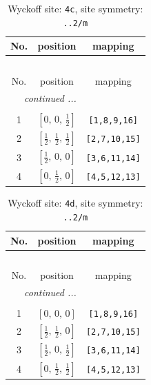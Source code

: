 \documentclass[fleqn,8pt]{jsarticle}
\begin{document}
\renewcommand{\arraystretch}{1.2}
\begin{longtable}{ccc}
\caption{Wyckoff site: {\tt 4c}, site symmetry: {\tt ..2/m}}
 \\
 \hline \hline
No. & position & mapping \\ \hline \endfirsthead

\multicolumn{2}{l}{\tablename\ \thetable{}} \\
 \hline \hline
No. & position & mapping \\ \hline \endhead

 \hline \hline
\multicolumn{2}{r}{\footnotesize\it continued ...} \\ \endfoot

 \hline \hline
\multicolumn{2}{r}{} \\ \endlastfoot

1 & $\left[ 0,\, 0,\, \frac{1}{2} \right]$ & {\tt [1,8,9,16]} \\ \hline
2 & $\left[ \frac{1}{2},\, \frac{1}{2},\, \frac{1}{2} \right]$ & {\tt [2,7,10,15]} \\ \hline
3 & $\left[ \frac{1}{2},\, 0,\, 0 \right]$ & {\tt [3,6,11,14]} \\ \hline
4 & $\left[ 0,\, \frac{1}{2},\, 0 \right]$ & {\tt [4,5,12,13]} \\
\end{longtable}
\renewcommand{\arraystretch}{1.2}
\begin{longtable}{ccc}
\caption{Wyckoff site: {\tt 4d}, site symmetry: {\tt ..2/m}}
 \\
 \hline \hline
No. & position & mapping \\ \hline \endfirsthead

\multicolumn{2}{l}{\tablename\ \thetable{}} \\
 \hline \hline
No. & position & mapping \\ \hline \endhead

 \hline \hline
\multicolumn{2}{r}{\footnotesize\it continued ...} \\ \endfoot

 \hline \hline
\multicolumn{2}{r}{} \\ \endlastfoot

1 & $\left[ 0,\, 0,\, 0 \right]$ & {\tt [1,8,9,16]} \\ \hline
2 & $\left[ \frac{1}{2},\, \frac{1}{2},\, 0 \right]$ & {\tt [2,7,10,15]} \\ \hline
3 & $\left[ \frac{1}{2},\, 0,\, \frac{1}{2} \right]$ & {\tt [3,6,11,14]} \\ \hline
4 & $\left[ 0,\, \frac{1}{2},\, \frac{1}{2} \right]$ & {\tt [4,5,12,13]} \\
\end{longtable}
\end{document}
